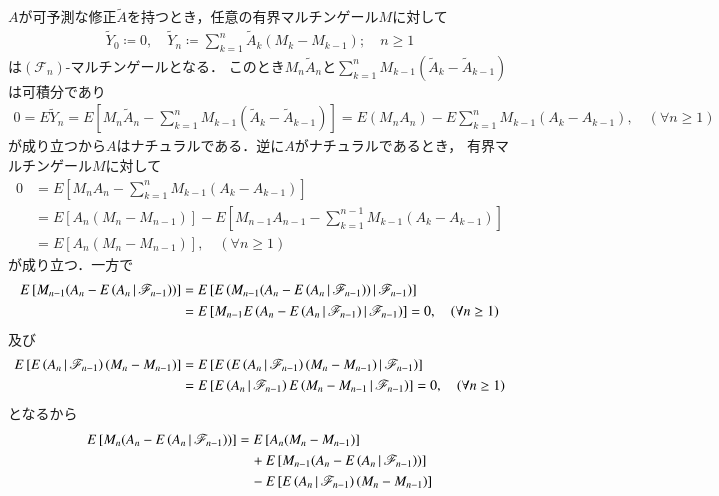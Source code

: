 	\begin{prf}
		$A$が可予測な修正$\tilde{A}$を持つとき，任意の有界マルチンゲール$M$に対して
		\begin{align}
			\tilde{Y}_0 \coloneqq 0,
			\quad \tilde{Y}_n \coloneqq \sum_{k=1}^n \tilde{A}_k(M_k - M_{k-1}); \quad n \geq 1
		\end{align}
		は$(\mathscr{F}_n)$-マルチンゲールとなる．
		このとき$M_n \tilde{A}_n$と$\sum_{k=1}^n M_{k-1}(\tilde{A}_k - \tilde{A}_{k-1})$は可積分であり
		\begin{align}
			0 = E \tilde{Y}_n = E\left[ M_n \tilde{A}_n - \sum_{k=1}^n M_{k-1}(\tilde{A}_k - \tilde{A}_{k-1}) \right]
			= E(M_n A_n) - E\sum_{k=1}^n M_{k-1}(A_k - A_{k-1}),
			\quad (\forall n \geq 1)
		\end{align}
		が成り立つから$A$はナチュラルである．逆に$A$がナチュラルであるとき，
		有界マルチンゲール$M$に対して
		\begin{align}
			0 &= E\left[ M_n A_n - \sum_{k=1}^n M_{k-1}(A_k - A_{k-1}) \right] \\
			&= E\left[ A_n(M_n-M_{n-1}) \right] - E\left[ M_{n-1} A_{n-1} - \sum_{k=1}^{n-1} M_{k-1}(A_k - A_{k-1}) \right] \\
			&= E\left[ A_n(M_n-M_{n-1}) \right],
			\quad (\forall n \geq 1)
		\end{align}
		が成り立つ．一方で
		\begin{align}
			E\left[ M_{n-1}(A_n-E\left( A_n \, \middle|\, \mathscr{F}_{n-1} \right)) \right]
			&= E\left[ E\left( M_{n-1} (A_n-E\left( A_n \, \middle|\, \mathscr{F}_{n-1} \right)) \, \middle|\, \mathscr{F}_{n-1} \right) \right] \\
			&= E\left[ M_{n-1} E\left( A_n-E\left( A_n \, \middle|\, \mathscr{F}_{n-1} \right) \, \middle|\, \mathscr{F}_{n-1} \right) \right]
			= 0,
			\quad (\forall n \geq 1)
		\end{align}
		及び
		\begin{align}
			E\left[ E\left( A_n \, \middle|\, \mathscr{F}_{n-1} \right)(M_n-M_{n-1}) \right]
			&= E\left[ E\left(  E\left( A_n \, \middle|\, \mathscr{F}_{n-1} \right)(M_n-M_{n-1}) \, \middle|\, \mathscr{F}_{n-1} \right) \right] \\
			&= E\left[ E\left( A_n \, \middle|\, \mathscr{F}_{n-1} \right)E\left( M_n-M_{n-1} \, \middle|\, \mathscr{F}_{n-1} \right) \right]
			= 0,
			\quad (\forall n \geq 1)
		\end{align}
		となるから
		\begin{align}
			E\left[ M_n(A_n - \cexp{A_n}{\mathscr{F}_{n-1}}) \right]
			&= E\left[ A_n(M_n-M_{n-1}) \right] \\
			&\quad	+ E\left[ M_{n-1}(A_n-\cexp{A_n}{\mathscr{F}_{n-1}}) \right] \\
			&\quad	- E\left[ \cexp{A_n}{\mathscr{F}_{n-1}}(M_n-M_{n-1}) \right] \\

\end{align}
\end{prf}
